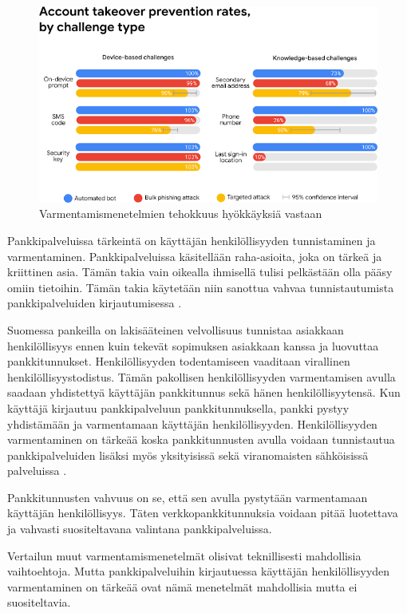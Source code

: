 \begin{figure}[ht]
    \centering
    \includegraphics[width=12cm]{template/figures/account takeover provention rates.png}
    \caption{Varmentamismenetelmien tehokkuus hyökkäyksiä vastaan \citep{google_security}}
    \label{fig:account_takeover_rates}
\end{figure}

Pankkipalveluissa tärkeintä on käyttäjän henkilöllisyyden tunnistaminen ja varmentaminen. Pankkipalveluissa käsitellään raha-asioita, joka on tärkeä ja kriittinen asia. Tämän takia vain oikealla ihmisellä tulisi pelkästään olla pääsy omiin tietoihin. Tämän takia käytetään niin sanottua vahvaa tunnistautumista pankkipalveluiden kirjautumisessa \citep{kpclient}.

Suomessa pankeilla on lakisääteinen velvollisuus tunnistaa asiakkaan henkilöllisyys ennen kuin tekevät sopimuksen asiakkaan kanssa ja luovuttaa pankkitunnukset. Henkilöllisyyden todentamiseen vaaditaan virallinen henkilöllisyystodistus. Tämän pakollisen henkilöllisyyden varmentamisen avulla saadaan yhdistettyä käyttäjän pankkitunnus sekä hänen henkilöllisyytensä. Kun käyttäjä kirjautuu pankkipalveluun pankkitunnuksella, pankki pystyy yhdistämään ja varmentamaan käyttäjän henkilöllisyyden. Henkilöllisyyden varmentaminen on tärkeää koska pankkitunnusten avulla voidaan tunnistautua pankkipalveluiden lisäksi myös yksityisissä sekä viranomaisten sähköisissä palveluissa \citep{FINE_verkkopankkitunnukset}.

Pankkitunnusten vahvuus on se, että sen avulla pystytään varmentamaan käyttäjän henkilöllisyys. Täten verkkopankkitunnuksia voidaan pitää luotettava ja vahvasti suositeltavana valintana pankkipalveluissa.

Vertailun muut varmentamismenetelmät olisivat teknillisesti mahdollisia vaihtoehtoja. Mutta pankkipalveluihin kirjautuessa käyttäjän henkilöllisyyden varmentaminen on tärkeää ovat nämä menetelmät mahdollisia mutta ei suositeltavia.

